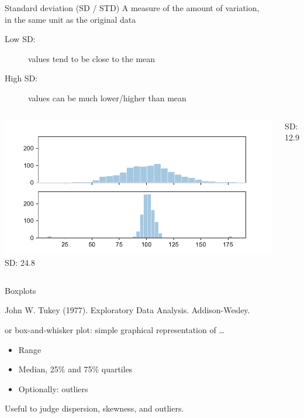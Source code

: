 \documentclass[aspectratio=169,usenames,dvipsnames]{beamer}
\begin{document}
\begin{frame}{Standard deviation (SD / STD)}
A measure of the amount of variation,\\
in the same unit as the original data

\begin{description}
    \item[Low SD:] values tend to be close to the mean
    \item[High SD:] values can be much lower/higher than mean
\end{description}

\pause
    \begin{columns}[T]
            \includegraphics[width=\textwidth]{fig/disp.pdf}
            \vspace{3em}
            SD: 24.8

            \vspace{4em}
            SD: 12.9
    \end{columns}
\end{frame}

\begin{frame}{Boxplots}
    \begin{reference}
        John W. Tukey (1977). Exploratory Data Analysis. Addison-Wesley.
    \end{reference}
        
     or box-and-whisker plot:
    simple graphical representation of \dots

    \begin{itemize}
        \item Range
        \item Median, 25\% and 75\% quartiles
        \item Optionally: outliers
    \end{itemize}

    Useful to judge dispersion, skewness, and outliers.
\end{frame}
\end{document}
